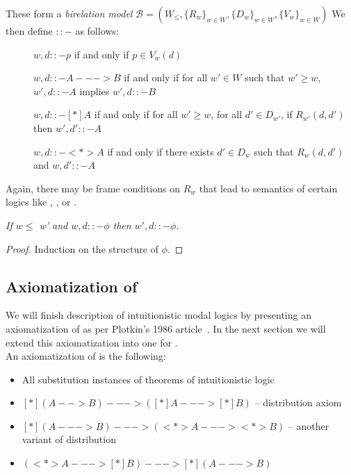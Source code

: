 These form a \emph{birelation model} $\mathcal B = (W_\leq, \{R_w\}_{w \in W}, \{D_w\}_{w \in W}, \{V_w\}_{w \in W})$ We then define $::-$ as follows:
\begin{description}
\item[] $w, d ::- p$ if and only if $ p\in V_w(d)$
\item[] $w, d ::- A ---> B$ if and only if for all $w' \in W$ such that $w' \geq w$, $w' , d ::- A$ implies $w' , d ::- B$
\item[] $w, d ::- [*]A$ if and only if for all $w' \geq w$, for all $d' \in D_{w'}$,  if $R_{w'}(d, d')$ then $w', d' ::- A$
\item[] $w, d ::- <*>A$ if and only if there exists $d' \in D_{w}$ such that $R_w(d, d')$ and $w, d' ::- A$
\end{description}

Again, there may be frame conditions on $R_w$ that lead to semantics of certain logics like \logiciK{}, \logiciT{}, \logiciSfour{} or \logiciSfive{}. 

\begin{lemma}[Monotonicity]\em
If $w \leq$ w' and $w, d ::- \phi$ then $w', d ::- \phi$.
\begin{proof}
Induction on the structure of $\phi$.
\end{proof}
\end{lemma}

\subsection{Axiomatization of \logiciK{}}
We will finish description of intuitionistic modal logics by presenting an axiomatization of \logiciK{} as per Plotkin's 1986 article~\cite{plotkin1986}. In the next section we will extend this axiomatization into one for \logic{}.\\

An axiomatization of \logiciK{} is the following:

\begin{itemize}
\item[] All substitution instances of theorems of intuitionistic logic
\item[] $[*](A --> B) ---> ([*]A ---> [*]B)$ -- distribution axiom \axiomK{}
\item[] $[*](A ---> B) ---> (<*>A ---> <*>B)$ -- another variant of distribution
\item[] $(<*>A ---> [*]B) ---> [*] (A ---> B)$
\end{itemize} 


